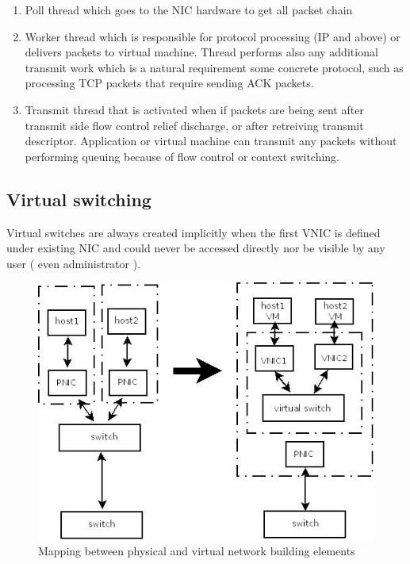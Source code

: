 \documentclass[11pt]{book}
\begin{document}
			\begin{enumerate}
				\item{Poll thread which goes to the NIC hardware to get all packet chain}
				\item{Worker thread which is responsible for protocol processing (IP and above) or delivers packets to virtual machine. Thread performs also any additional transmit work which is a natural 
				requirement some concrete protocol, such as processing TCP packets that require sending ACK packets.}
				\item{Transmit thread that is activated when if packets are being sent after transmit side flow control relief discharge, or after retreiving transmit descriptor. Application or virtual 
				machine can transmit any packets without performing queuing because of flow control or context switching.}
			\end{enumerate}

                \subsection{Virtual switching}
			
			Virtual switches are always created implicitly when the first VNIC is defined under existing NIC and could never be accessed directly nor be visible by
			any user ( even administrator ). 
			
			\begin{figure}[H]
				\includegraphics[width=\textwidth]{img/physical_and_virtual_switches_mapping.jpeg}
				\caption{Mapping between physical and virtual network building elements}
			\end{figure}
			
\end{document}
